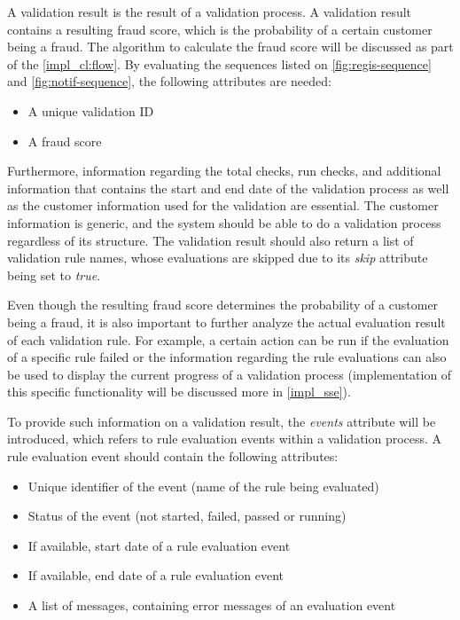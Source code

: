     A validation result is the result of a validation process. A validation result contains a resulting fraud score, which is the probability of a certain customer being a fraud. The algorithm to calculate the fraud score will be discussed as part of the \autoref{impl_cl:flow}.
    By evaluating the sequences listed on \autoref{fig:regis-sequence} and \autoref{fig:notif-sequence}, the following attributes are needed:

    \begin{itemize}
      \item A unique validation ID
      \item A fraud score 
    \end{itemize}

    Furthermore, information regarding the total checks, run checks, and additional information that contains the start and end date of the validation process as well as the customer information used for the validation are essential. The customer information is generic, and the system should be able to do a validation process regardless of its structure. The validation result should also return a list of validation rule names, whose evaluations are skipped due to its \emph{skip} attribute being set to \emph{true}.

    Even though the resulting fraud score determines the probability of a customer being a fraud, it is also important to further analyze the actual evaluation result of each validation rule. For example, a certain action can be run if the evaluation of a specific rule failed or the information regarding the rule evaluations can also be used to display the current progress of a validation process (implementation of this specific functionality will be discussed more in \autoref{impl_sse}). 

    To provide such information on a validation result, the \emph{events} attribute will be introduced, which refers to rule evaluation events within a validation process. A rule evaluation event should contain the following attributes:

    \begin{itemize}
      \item Unique identifier of the event (name of the rule being evaluated)
      \item Status of the event (not started, failed, passed or running) 
      \item If available, start date of a rule evaluation event 
      \item If available, end date of a rule evaluation event 
      \item A list of messages, containing error messages of an evaluation event
    \end{itemize}

